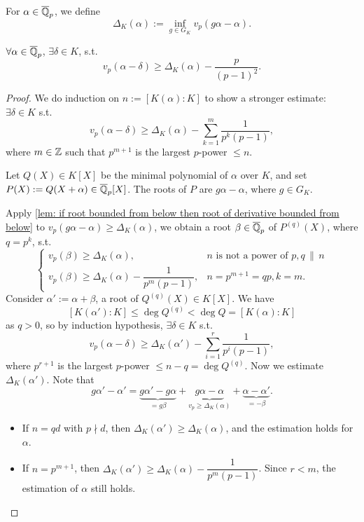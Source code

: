 For $\alpha\in\overline{\mathbb{Q}}_p$, we define \[\Delta_K(\alpha) := \inf_{g\in G_K} v_p(g\alpha - \alpha).\]
\begin{theorem}
    [Ax]
    $\forall \alpha\in\overline{\mathbb{Q}}_p$, $\exists\delta\in K$, s.t. \[v_p(\alpha - \delta)\ge\Delta_K(\alpha) - \frac{p}{(p-1)^2}.\]
\end{theorem}
\begin{proof}
    We do induction on $n := [K(\alpha) : K]$ to show a stronger estimate: $\exists\delta\in K$ s.t.
    \[v_p(\alpha - \delta) \ge \Delta_K(\alpha) - \sum_{k=1}^{m}\frac{1}{p^k(p-1)},\]
    where $m\in\mathbb{Z}$ such that $p^{m+1}$ is the largest $p$-power $\le n$.

    Let $Q(X)\in K[X]$ be the minimal polynomial of $\alpha$ over $K$,
    and set $P(X) := Q(X +\alpha)\in\overline{\mathbb{Q}}_p[X]$.
    The roots of $P$ are $g\alpha - \alpha$, where $g\in G_K$.

    Apply \cref{lem: if root bounded from below then root of derivative bounded from below}
    to $v_p(g\alpha - \alpha)\ge \Delta_K(\alpha)$,
    we obtain a root $\beta\in\overline{\mathbb{Q}}_p$ of $P^{(q)}(X)$,
    where $q = p^k$,
    s.t. \[\begin{cases}
        v_p(\beta)\ge \Delta_K(\alpha), &n \text{ is not a power of } p, q\,\|\,n\\
        v_p(\beta)\ge \Delta_K(\alpha) - \dfrac{1}{p^m(p-1)}, &n = p^{m + 1} = qp, k = m.
    \end{cases}\]
    Consider $\alpha' := \alpha + \beta$, a root of $Q^{(q)}(X)\in K[X]$.
    We have \[[K(\alpha') : K]\le\deg Q^{(q)} < \deg Q = [K (\alpha) : K]
    \] as $q > 0$, so by induction hypothesis,
    $\exists\delta\in K$ s.t. \[v_p(\alpha - \delta)\ge \Delta_K(\alpha') - \sum_{i=1}^{r}\frac{1}{p^i(p-1)},\]
    where $p^{r+1}$ is the largest $p$-power $\le n - q = \deg Q^{(q)}$.
    Now we estimate $\Delta_K(\alpha')$.
    Note that \[g\alpha' - \alpha'
    = \underbrace{g\alpha' - g\alpha}_{=g\beta}
    +\underbrace{g\alpha - \alpha}_{v_p\ge \Delta_K(\alpha)}
    +\underbrace{\alpha - \alpha'}_{ = -\beta}.\]
\begin{itemize}
    \item If $n = qd$ with $p\nmid d$,
    then $\Delta_K(\alpha')\ge \Delta_K(\alpha)$,
    and the estimation holds for $\alpha$.
    \item If $n = p^{m+1}$, then $\Delta_K(\alpha')\ge \Delta_K(\alpha) - \dfrac{1}{p^m(p-1)}$.
    Since $r < m$, the estimation of $\alpha$ still holds.\qedhere
\end{itemize}
\end{proof}

